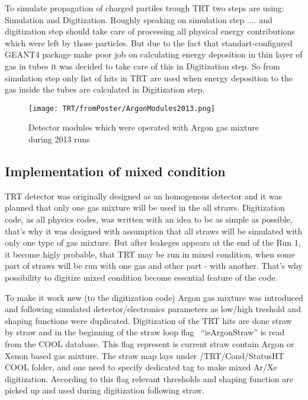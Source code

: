 To simulate propagation of charged partiles trough TRT two steps are using: Simulation and Digitization. 
Roughly speaking on simulation step .... and digitization step should take care of processing all physical energy contributions which were left by those particles.
But due to the fact that standart-configured GEANT4 package make poor job on calculating energy deposition in thin layer of gas in tubes it was decided to take care 
of this in Digitization step. So from simulation step only list of hits in TRT are used when energy deposition to the gas inside the tubes are calculated in Digitization step.


\begin{figure}[h]
\begin{center}
 \texttt{[image: TRT/fromPoster/ArgonModules2013.png]}
\caption{\label{fig:argonModulesIn2013} Detector modules which were operated with Argon gas mixture during 2013 runs}
\end{center}
\end{figure}





\subsection{Implementation of mixed condition}
TRT detector was originally designed as an homogenous detector and it was planned that only one gas mixture will be used in the all straws. 
Digitization code, as all physics codes, was written with an idea to be as simple as possible, that's why it was designed with assumption that all straws will be simulated with only one type of gas mixture.
But after leakeges appears at the end of the Run 1, it become higly probable, that TRT may be run in mixed condition, when some part of straws will be run with one gas and other part - with another. That's why 
possibility to digitize mixed condition become essential feature of the code. 

To make it work new (to the digitization code) Argon gas mixture was introduced and following simulated detector/electronics parameters as low/high treshold and shaping functions were duplicated.
Digitization of the TRT hits are done straw by straw and in the beginning of the straw loop flag \mbox{ ``isArgonStraw''} is read from the COOL database. This flag represent is current straw contain Argon or Xenon based 
gas mixture. The straw map lays under \mbox{/TRT/Cond/StatusHT} COOL folder, and one need to specify dedicated tag to make mixed Ar/Xe digitization.
According to this flag relevant thresholds and shaping function are picked up and used during digitization following straw. 

